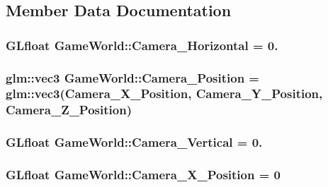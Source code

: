 \subsection{Member Data Documentation}
\hypertarget{class_game_world_a7f4911dda9b3b4e4eb03ece87e16cd96}{}
\subsubsection[{Camera\+\_\+\+Horizontal}]{\setlength{\rightskip}{0pt plus 5cm}G\+Lfloat Game\+World\+::\+Camera\+\_\+\+Horizontal = 0.}\label{class_game_world_a7f4911dda9b3b4e4eb03ece87e16cd96}
\hypertarget{class_game_world_ad80e597474ea4c52a583e81788187571}{}
\subsubsection[{Camera\+\_\+\+Position}]{\setlength{\rightskip}{0pt plus 5cm}glm\+::vec3 Game\+World\+::\+Camera\+\_\+\+Position = glm\+::vec3({\bf Camera\+\_\+\+X\+\_\+\+Position}, {\bf Camera\+\_\+\+Y\+\_\+\+Position}, {\bf Camera\+\_\+\+Z\+\_\+\+Position})}\label{class_game_world_ad80e597474ea4c52a583e81788187571}
\hypertarget{class_game_world_a26658e739c4d267b1be35ed820089931}{}
\subsubsection[{Camera\+\_\+\+Vertical}]{\setlength{\rightskip}{0pt plus 5cm}G\+Lfloat Game\+World\+::\+Camera\+\_\+\+Vertical = 0.}\label{class_game_world_a26658e739c4d267b1be35ed820089931}
\hypertarget{class_game_world_ad07b1f650edb08ddb05e74a22588bda0}{}
\subsubsection[{Camera\+\_\+\+X\+\_\+\+Position}]{\setlength{\rightskip}{0pt plus 5cm}G\+Lfloat Game\+World\+::\+Camera\+\_\+\+X\+\_\+\+Position = 0}\label{class_game_world_ad07b1f650edb08ddb05e74a22588bda0}
\hypertarget{class_game_world_ae3e7cab30494ff5a8e91dfa7406deb16}{}

